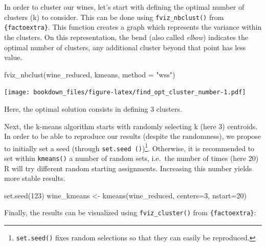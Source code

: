\documentclass[
]{krantz}
\makeatletter
\newenvironment{Shaded}{\begin{snugshade}}{\end{snugshade}}
\newcommand{\AttributeTok}[1]{\textcolor[rgb]{0.61,0.61,0.61}{#1}}
\newcommand{\ConstantTok}[1]{\textcolor[rgb]{0,0,0}{#1}}
\newcommand{\DecValTok}[1]{\textcolor[rgb]{0.06,0.06,0.06}{#1}}
\newcommand{\FunctionTok}[1]{\textcolor[rgb]{0,0,0}{#1}}
\newcommand{\NormalTok}[1]{#1}
\newcommand{\OtherTok}[1]{\textcolor[rgb]{0.37,0.37,0.37}{#1}}
\newcommand{\SpecialCharTok}[1]{\textcolor[rgb]{0,0,0}{#1}}
\newcommand{\StringTok}[1]{\textcolor[rgb]{0.5,0.5,0.5}{#1}}
\newenvironment{kframe}{%
\medskip{}
\setlength{\fboxsep}{.8em}
 \def\at@end@of@kframe{}%
 \ifinner\ifhmode%
  \def\at@end@of@kframe{\end{minipage}}%
  \begin{minipage}{\columnwidth}%
 \fi\fi%
 \def\FrameCommand##1{\hskip\@totalleftmargin \hskip-\fboxsep
 \colorbox{shadecolor}{##1}\hskip-\fboxsep
     \hskip-\linewidth \hskip-\@totalleftmargin \hskip\columnwidth}%
 \MakeFramed {\advance\hsize-\width
   \@totalleftmargin\z@ \linewidth\hsize
   \@setminipage}}%
 {\par\unskip\endMakeFramed%
 \at@end@of@kframe}
\renewenvironment{Shaded}{\begin{kframe}}{\end{kframe}}
\makeatother
\begin{document}
In order to cluster our wines, let's start with defining the optimal number of clusters (k) to consider. This can be done using \texttt{fviz\_nbclust()} from \texttt{\{factoextra\}}. This function creates a graph which represents the variance within the clusters. On this representation, the bend (also called \emph{elbow}) indicates the optimal number of clusters, any additional cluster beyond that point has less value.

\begin{Shaded}
\begin{Highlighting}[]
\FunctionTok{fviz\_nbclust}\NormalTok{(wine\_reduced, kmeans, }\AttributeTok{method =} \StringTok{"wss"}\NormalTok{)}
\end{Highlighting}
\end{Shaded}

\texttt{[image: bookdown\_files/figure-latex/find\_opt\_cluster\_number-1.pdf]}

Here, the optimal solution consists in defining 3 clusters.

Next, the k-means algorithm starts with randomly selecting k (here 3) centroids. In order to be able to reproduce our results (despite the randomness), we propose to initially set a seed (through \texttt{set.seed\ ()})\footnote{\texttt{set.seed()} fixes random selections so that they can easily be reproduced.}. Otherwise, it is recommended to set within \texttt{kmeans()} a number of random sets, i.e.~the number of times (here 20) R will try different random starting assignments. Increasing this number yields more stable results.

\begin{Shaded}
\begin{Highlighting}[]
\FunctionTok{set.seed}\NormalTok{(}\DecValTok{123}\NormalTok{)}
\NormalTok{wine\_kmeans }\OtherTok{\textless{}{-}} \FunctionTok{kmeans}\NormalTok{(wine\_reduced, }\AttributeTok{centers=}\DecValTok{3}\NormalTok{, }\AttributeTok{nstart=}\DecValTok{20}\NormalTok{)}
\end{Highlighting}
\end{Shaded}

Finally, the results can be visualized using \texttt{fviz\_cluster()} from \texttt{\{factoextra\}}:

\begin{Shaded}
\end{Shaded}
\end{document}
